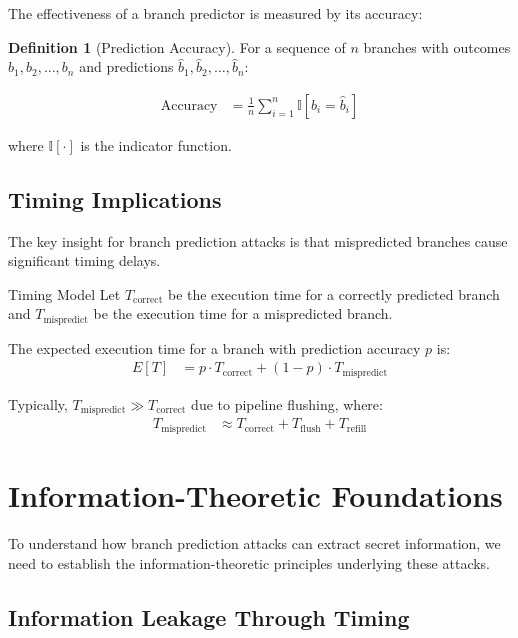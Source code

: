 \documentclass[11pt,a4paper]{article}
\theoremstyle{definition}
\newtheorem{definition}{Definition}[section]
\begin{document}
The effectiveness of a branch predictor is measured by its accuracy:

\begin{definition}[Prediction Accuracy]
For a sequence of $n$ branches with outcomes $b_1, b_2, \ldots, b_n$ and predictions $\hat{b}_1, \hat{b}_2, \ldots, \hat{b}_n$:

\begin{align}
\text{Accuracy} &= \frac{1}{n} \sum_{i=1}^{n} \mathbb{I}[b_i = \hat{b}_i]
\end{align}

where $\mathbb{I}[\cdot]$ is the indicator function.
\end{definition}

\subsection{Timing Implications}

The key insight for branch prediction attacks is that mispredicted branches cause significant timing delays.

\begin{mathematicsbox}{Timing Model}
Let $T_{\text{correct}}$ be the execution time for a correctly predicted branch and $T_{\text{mispredict}}$ be the execution time for a mispredicted branch.

The expected execution time for a branch with prediction accuracy $p$ is:
\begin{align}
E[T] &= p \cdot T_{\text{correct}} + (1-p) \cdot T_{\text{mispredict}}
\end{align}

Typically, $T_{\text{mispredict}} \gg T_{\text{correct}}$ due to pipeline flushing, where:
\begin{align}
T_{\text{mispredict}} &\approx T_{\text{correct}} + T_{\text{flush}} + T_{\text{refill}}
\end{align}
\end{mathematicsbox}

\section{Information-Theoretic Foundations}

To understand how branch prediction attacks can extract secret information, we need to establish the information-theoretic principles underlying these attacks.

\subsection{Information Leakage Through Timing}
\end{document}
